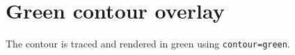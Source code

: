 \documentclass{article}
\begin{document}
\section*{Green contour overlay}

The contour is traced and rendered in green using
\texttt{contour=green}.

\lipsum[1-8]
\end{document}
